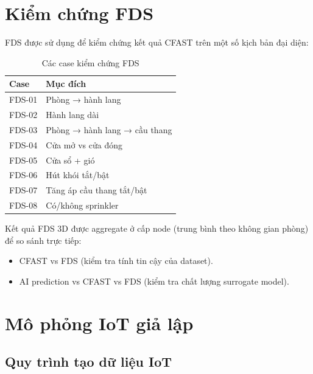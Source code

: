 \section{Kiểm chứng FDS}
\label{sec:fdsvalidation}

FDS được sử dụng để kiểm chứng kết quả CFAST trên một số kịch bản đại diện:

\begin{table}[H]
\centering
\caption{Các case kiểm chứng FDS}
\label{tab:fdscases}
\begin{tabular}{l l}
\toprule
\textbf{Case} & \textbf{Mục đích} \\
\midrule
FDS-01 & Phòng → hành lang \\
FDS-02 & Hành lang dài \\
FDS-03 & Phòng → hành lang → cầu thang \\
FDS-04 & Cửa mở vs cửa đóng \\
FDS-05 & Cửa sổ + gió \\
FDS-06 & Hút khói tắt/bật \\
FDS-07 & Tăng áp cầu thang tắt/bật \\
FDS-08 & Có/không sprinkler \\
\bottomrule
\end{tabular}
\end{table}

Kết quả FDS 3D được aggregate ở cấp node (trung bình theo không gian phòng) để so sánh trực tiếp:
\begin{itemize}
  \item CFAST vs FDS (kiểm tra tính tin cậy của dataset).
  \item AI prediction vs CFAST vs FDS (kiểm tra chất lượng surrogate model).
\end{itemize}

\section{Mô phỏng IoT giả lập}
\label{sec:iotmethod}

\subsection{Quy trình tạo dữ liệu IoT}

